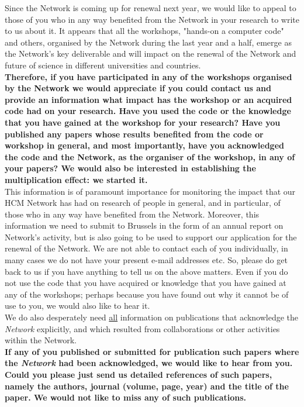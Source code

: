 {\noindent
Since the Network is coming up for renewal next year, we would like to appeal 
to those of you who in any way benefited from the Network in your research to
write to us about it. It appears that all the workshops, "hands-on a computer 
code" and others, organised by the Network during the last year and a half, 
emerge as the Network's key deliverable and will impact on the renewal of the
Network and future of science in different universities and countries. \\

\noindent
{\bf Therefore, if you have participated in any of the workshops organised by the Network
we would appreciate if you could contact us and provide  an information what 
impact has the workshop or an acquired code had on your research. Have you used the code or
the knowledge that you have gained at the workshop for your research? Have you 
published any papers whose results benefited from the code or workshop in general, 
and most importantly, have you acknowledged the code and the Network, as the organiser 
of the workshop, in any of your papers? We would also be interested in establishing
the multiplication effect: we started it.} \\

This information is of paramount importance for monitoring the impact that our HCM 
Network has had on research of people in general, and in particular, of those who 
in any way have benefited from the Network. Moreover, this information we need to 
submit to Brussels in the form of an annual report on Network's activity, but is also
going to be used to support our application for the renewal of the Network.  
We are not able to contact each of you individually, in many
cases we do not have your present e-mail addresses etc. So, please do get back to us
if you have anything to tell us on the above matters. Even if you do not use the 
code that you have acquired or knowledge that you have gained at any of the workshops; 
perhaps because you have found out why it cannot be of use to you, we would also 
like to hear it.\\

\noindent
We do also desperately need \underline{all} information on publications that acknowledge 
the {\it Network} explicitly, and which resulted from collaborations or other activities 
within the Network.\\

{\bf If any of you published or submitted for publication such papers
where the {\it Network} had been acknowledged, we would like to hear from you.
Could you please just send us detailed references of such papers, namely the
authors, journal (volume, page, year) and the title of the paper. We would not
like to miss any of such publications.} \\


}
